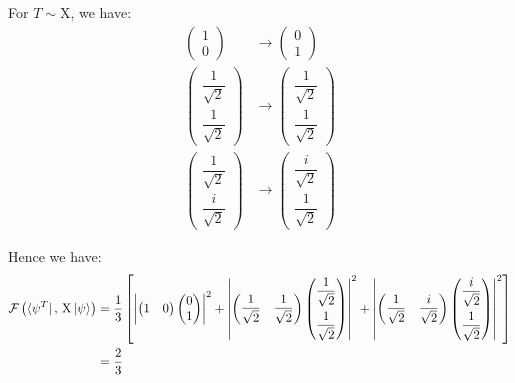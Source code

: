 \begin{parts}
	For $T \sim \mathrm{X}$, we have:
	\begin{align*}
		\begin{pmatrix}
			1 \\ 0
		\end{pmatrix} &\rightarrow
		\begin{pmatrix}
			0 \\ 1
		\end{pmatrix} \\
		\begin{pmatrix}
			\dfrac{1}{\sqrt{2}} \\[1em] \dfrac{1}{\sqrt{2}}
		\end{pmatrix} &\rightarrow
		\begin{pmatrix}
			\dfrac{1}{\sqrt{2}} \\[1em] \dfrac{1}{\sqrt{2}}
		\end{pmatrix} \\
		\begin{pmatrix}
			\dfrac{1}{\sqrt{2}} \\[1em] \dfrac{i}{\sqrt{2}}
		\end{pmatrix} &\rightarrow
		\begin{pmatrix}
			\dfrac{i}{\sqrt{2}} \\[1em] \dfrac{1}{\sqrt{2}}
		\end{pmatrix}
	\end{align*}
	
	Hence we have:
	\begin{align*}
		\mathcal{F}\left(\bra{\psi^T},\, \mathrm{X}\ket{\psi}\right) &= \frac{1}{3}\left[
		\left|\begin{pmatrix}
			1 & 0
		\end{pmatrix}
		\begin{pmatrix}
			0 \\ 1
		\end{pmatrix}\right|^2 +
		\left|\begin{pmatrix}
			\dfrac{1}{\sqrt{2}} & \dfrac{1}{\sqrt{2}}
		\end{pmatrix}
		\begin{pmatrix}
			\dfrac{1}{\sqrt{2}} \\[1em] \dfrac{1}{\sqrt{2}}
		\end{pmatrix}\right|^2 +
		\left|\begin{pmatrix}
			\dfrac{1}{\sqrt{2}} & \dfrac{i}{\sqrt{2}}
		\end{pmatrix}
		\begin{pmatrix}
			\dfrac{i}{\sqrt{2}} \\[1em] \dfrac{1}{\sqrt{2}}
		\end{pmatrix}\right|^2
		\right] \\
		&= \frac{2}{3}
	\end{align*}
	

\end{parts}
